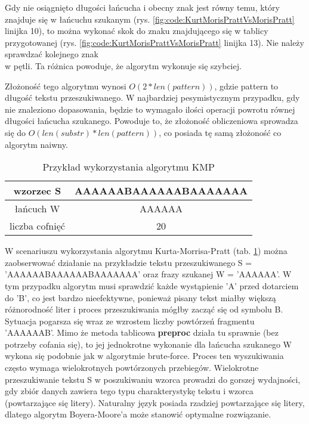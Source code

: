 Gdy nie osiągnięto długości łańcucha i obecny znak jest równy temu, który 
znajduje się w łańcuchu szukanym (rys. \ref{fig:code:KurtMorisPrattVsMorisPratt}
linijka 10), to można wykonać skok do znaku znajdującego się w tablicy
przygotowanej (rys. \ref{fig:code:KurtMorisPrattVsMorisPratt} linijka 13).
Nie należy sprawdzać kolejnego znak \\ w pętli. Ta różnica powoduje, że algorytm 
wykonuje się szybciej.

Złożoność tego algorytmu wynosi $O(2*{len(pattern)})$, gdzie pattern to długość
tekstu przeszukiwanego. W najbardziej pesymistycznym przypadku, gdy nie 
znaleziono dopasowania, będzie to wymagało ilości operacji powrotu równej długości 
łańcucha szukanego. Powoduje to, że złożoność obliczeniowa sprowadza się do
$O({len(substr)}*{len(pattern)})$, co posiada tę samą złożoność co algorytm naiwny. 

\begin{table}[hbtp]
  \centering
  \begin{tabular}{ |c|c|  } 
    \hline
    wzorzec S & AAAAAABAAAAAABAAAAAAA \\
    \hline
    łańcuch W & AAAAAA \\
    \hline
    liczba cofnięć & 20 \\
    \hline
  \end{tabular}
  \caption{Przykład wykorzystania algorytmu KMP}
  \label{tabela:KMPExampleSlow}
\end{table}

W scenariuszu wykorzystania algorytmu Kurta-Morrisa-Pratt (tab. \ref{tabela:KMPExampleSlow})
można zaobserwować działanie na przykładzie tekstu przeszukiwanego S = 
'AAAAAABAAAAAABAAAAAAA' oraz frazy szukanej W = 'AAAAAA'. W tym przypadku algorytm musi sprawdzić każde
wystąpienie 'A' przed dotarciem do 'B', co jest bardzo nieefektywne, ponieważ
pisany tekst miałby większą różnorodność liter i proces przeszukiwania mógłby 
zacząć się od symbolu B. Sytuacja 
pogarsza się wraz ze wzrostem liczby powtórzeń fragmentu 'AAAAAAB'. Mimo że 
metoda tablicowa \textbf{preproc} działa tu sprawnie (bez potrzeby cofania się), to jej 
jednokrotne wykonanie dla łańcucha szukanego W wykona się podobnie jak w algorytmie
brute-force. Proces ten wyszukiwania często wymaga wielokrotnych powtórzonych przebiegów. 
Wielokrotne przeszukiwanie tekstu S w poszukiwaniu wzorca prowadzi do gorszej
wydajności, gdy zbiór danych zawiera tego typu 
charakterystykę tekstu i wzorca (powtarzające się litery). Naturalny język posiada
rzadziej powtarzające się litery, dlatego algorytm Boyera-Moore'a może stanowić 
optymalne rozwiązanie.

